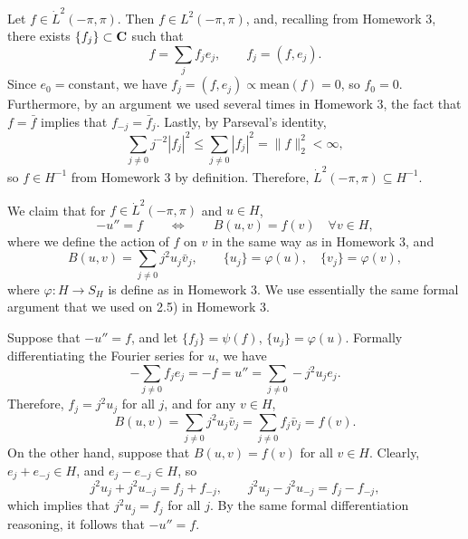 \documentclass{homework}
\begin{document}
	\begin{arabicparts}
		\questionpart Let $f \in \dot{L}^2(-\pi, \pi)$. Then $f \in L^2(-\pi,\pi)$, and, recalling from Homework 3, there exists $\{f_j\} \subset \textnormal{\bf C}$ such that
		\begin{equation}
			f = \sum_j f_j e_j, \qquad f_j = (f, e_j).
		\end{equation}
		Since $e_0 = \text{constant}$, we have $f_j = (f,e_j) \propto \mathrm{mean}(f) = 0$, so $f_0 = 0$. Furthermore, by an argument we used several times in Homework 3, the fact that $f = \bar{f}$ implies that $f_{-j} = \bar{f}_j$. Lastly, by Parseval's identity,
		\begin{equation}
			\sum_{j\ne 0}j^{-2}|f_j|^2 \le \sum_{j\ne0}|f_j|^2 = \lVert f\rVert_2^2 < \infty,
		\end{equation}
		so $f \in H^{-1}$ from Homework 3 by definition. Therefore, $\dot{L}^2(-\pi,\pi) \subseteq H^{-1}$.
		
		We claim that for $f \in \dot{L}^2(-\pi,\pi)$ and $u \in H$,
		\begin{equation}
			-u'' = f \qquad \iff \qquad B(u,v) = f(v) \quad\forall v\in H,
		\end{equation}
		where we define the action of $f$ on $v$ in the same way as in Homework 3, and
		\begin{equation}
			B(u,v) = \sum_{j\ne0}j^2u_j\bar{v}_j,\qquad \{u_j\} = \varphi(u),\quad\{v_j\} = \varphi(v),
		\end{equation}
		where $\varphi : H \to S_H$ is define as in Homework 3. We use essentially the same formal argument that we used on 2.5) in Homework 3.
		
		Suppose that $-u'' = f$, and let $\{f_j\} = \psi(f)$, $\{u_j\} = \varphi(u)$. Formally differentiating the Fourier series for $u$, we have
		\begin{equation}
			-\sum_{j\ne0}f_je_j = -f = u'' = \sum_{j\ne0} -j^2u_je_j.
		\end{equation}
		Therefore, $f_j = j^2u_j$ for all $j$, and for any $v \in H$,
		\begin{equation}
			B(u,v) = \sum_{j\ne0}j^2u_j\bar{v}_j = \sum_{j\ne0}f_j\bar{v}_j = f(v).
		\end{equation}
		On the other hand, suppose that $B(u,v) = f(v)$ for all $v \in H$. Clearly, $e_j + e_{-j} \in H$, and $e_j - e_{-j} \in H$, so
		\begin{equation}
			j^2u_j + j^2u_{-j} = f_j + f_{-j},\qquad j^2u_j - j^2u_{-j} = f_j - f_{-j},
		\end{equation}
		which implies that $j^2u_j = f_j$ for all $j$. By the same formal differentiation reasoning, it follows that $-u'' = f$.
		

\end{arabicparts}
\end{document}

